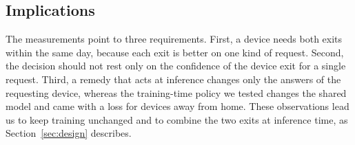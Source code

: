 \subsection{Implications}
\label{sec:implications}

The measurements point to three requirements. First, a device needs both exits within the same day, because each exit is better on one kind of request. Second, the decision should not rest only on the confidence of the device exit for a single request. Third, a remedy that acts at inference changes only the answers of the requesting device, whereas the training-time policy we tested changes the shared model and came with a loss for devices away from home. These observations lead us to keep training unchanged and to combine the two exits at inference time, as Section~\ref{sec:design} describes.
